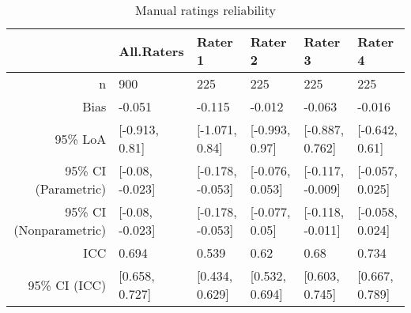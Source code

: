 \begin{table}[ht]
\centering
\begin{tabular}{rlllll}
  \hline
 & All.Raters & Rater 1 & Rater 2 & Rater 3 & Rater 4 \\ 
  \hline
n & 900 & 225 & 225 & 225 & 225 \\ 
  Bias & -0.051 & -0.115 & -0.012 & -0.063 & -0.016 \\ 
  95\% LoA & [-0.913, 0.81] & [-1.071, 0.84] & [-0.993, 0.97] & [-0.887, 0.762] & [-0.642, 0.61] \\ 
  95\% CI (Parametric) & [-0.08, -0.023] & [-0.178, -0.053] & [-0.076, 0.053] & [-0.117, -0.009] & [-0.057, 0.025] \\ 
  95\% CI (Nonparametric) & [-0.08, -0.023] & [-0.178, -0.053] & [-0.077, 0.05] & [-0.118, -0.011] & [-0.058, 0.024] \\ 
  ICC & 0.694 & 0.539 & 0.62 & 0.68 & 0.734 \\ 
  95\% CI (ICC) & [0.658, 0.727] & [0.434, 0.629] & [0.532, 0.694] & [0.603, 0.745] & [0.667, 0.789] \\ 
   \hline
\end{tabular}
\caption{Manual ratings reliability} 
\label{tab:summary}
\end{table}
